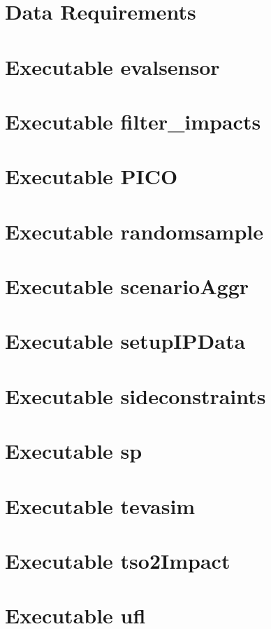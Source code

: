 %
\chapter{Data Requirements}\label{dataRequire} 
 
\chapter{Executable evalsensor}\label{evalsensorExecutable}

\newpage
\chapter{Executable filter\_impacts}\label{filter_impactsExecutable}

\newpage
\chapter{Executable PICO}\label{picoExecutable}

\newpage
\chapter{Executable randomsample}\label{randomsampleExecutable}

\newpage
\chapter{Executable scenarioAggr}\label{scenarioAggrExecutable}

\newpage
\chapter{Executable setupIPData}\label{setupIPDataExecutable}

\newpage
\chapter{Executable sideconstraints}\label{sideconstraintsExecutable}

\newpage
\chapter{Executable sp}\label{spExecutable}

\newpage
\chapter{Executable tevasim}\label{tevasimExecutable}

\newpage
\chapter{Executable tso2Impact}\label{tso2ImpactExecutable}

\newpage
\chapter{Executable ufl}\label{lagrangianExecutable}


